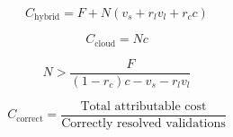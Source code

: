 \documentclass{article}
\begin{document}
\[
C_{\mathrm{hybrid}}=F+N\left(v_s+r_l v_l+r_c c\right)
\]

\[
C_{\mathrm{cloud}}=Nc
\]

\[
N>\frac{F}{(1-r_c)c-v_s-r_l v_l}
\]

\[
C_{\mathrm{correct}}=\frac{\text{Total attributable cost}}{\text{Correctly resolved validations}}
\]
\end{document}
